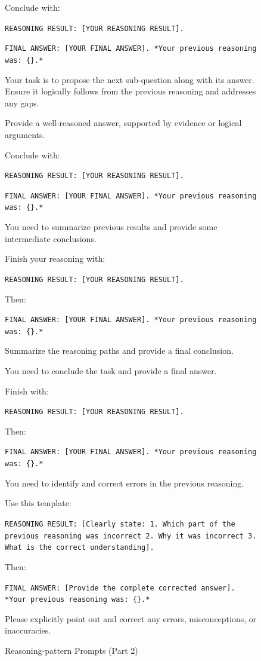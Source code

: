\documentclass{article}
\begin{document}
\begin{figure}[htbp]
\begin{tcolorbox}[title={reflect}]
Conclude with:

\texttt{REASONING RESULT: [YOUR REASONING RESULT].}

\texttt{FINAL ANSWER: [YOUR FINAL ANSWER]. *Your previous reasoning was: \{\}.*}
\end{tcolorbox}

\begin{tcolorbox}[title={question}]
Your task is to propose the next sub-question along with its answer. Ensure it logically follows from the previous reasoning and addresses any gaps.

Provide a well-reasoned answer, supported by evidence or logical arguments.

Conclude with:

\texttt{REASONING RESULT: [YOUR REASONING RESULT].}

\texttt{FINAL ANSWER: [YOUR FINAL ANSWER]. *Your previous reasoning was: \{\}.*}
\end{tcolorbox}


\end{figure}
\begin{figure}[htbp]
\centering
{}
\caption{Reasoning-pattern Prompts (Part 2)}
\label{actions_3}

\begin{tcolorbox}[title={summarize}]
You need to summarize previous results and provide some intermediate conclusions.

Finish your reasoning with:

\texttt{REASONING RESULT: [YOUR REASONING RESULT].}

Then:

\texttt{FINAL ANSWER: [YOUR FINAL ANSWER]. *Your previous reasoning was: \{\}.*}

Summarize the reasoning paths and provide a final conclusion.
\end{tcolorbox}
\begin{tcolorbox}[title={conclude}]
You need to conclude the task and provide a final answer.

Finish with:

\texttt{REASONING RESULT: [YOUR REASONING RESULT].}

Then:

\texttt{FINAL ANSWER: [YOUR FINAL ANSWER]. *Your previous reasoning was: \{\}.*}
\end{tcolorbox}

\begin{tcolorbox}[title={modify}]
You need to identify and correct errors in the previous reasoning.

Use this template:

\texttt{REASONING RESULT: [Clearly state: 1. Which part of the previous reasoning was incorrect 2. Why it was incorrect 3. What is the correct understanding].}

Then:

\texttt{FINAL ANSWER: [Provide the complete corrected answer]. *Your previous reasoning was: \{\}.*}

Please explicitly point out and correct any errors, misconceptions, or inaccuracies.
\end{tcolorbox}
\end{figure}
\end{document}
